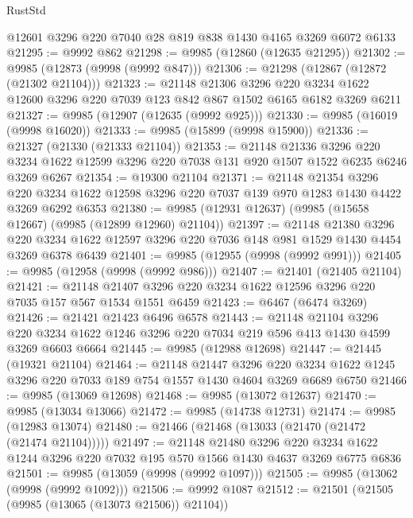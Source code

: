 \begin{lexlean}{RustStd}
\begin{coremodule}
    @12601
    @3296
    @220
    @7040
    @28
    @819
    @838
    @1430
    @4165
    @3269
    @6072
    @6133
@21295 := @9992 @862
@21298 := @9985 (@12860 (@12635 @21295))
@21302 := @9985 (@12873 (@9998 (@9992 @847)))
@21306 := @21298 (@12867 (@12872 (@21302 @21104)))
@21323 := @21148
    @21306
    @3296
    @220
    @3234
    @1622
    @12600
    @3296
    @220
    @7039
    @123
    @842
    @867
    @1502
    @6165
    @6182
    @3269
    @6211
@21327 := @9985 (@12907 (@12635 (@9992 @925)))
@21330 := @9985 (@16019 (@9998 @16020))
@21333 := @9985 (@15899 (@9998 @15900))
@21336 := @21327 (@21330 (@21333 @21104))
@21353 := @21148
    @21336
    @3296
    @220
    @3234
    @1622
    @12599
    @3296
    @220
    @7038
    @131
    @920
    @1507
    @1522
    @6235
    @6246
    @3269
    @6267
@21354 := @19300 @21104
@21371 := @21148
    @21354
    @3296
    @220
    @3234
    @1622
    @12598
    @3296
    @220
    @7037
    @139
    @970
    @1283
    @1430
    @4422
    @3269
    @6292
    @6353
@21380 := @9985 (@12931 @12637) (@9985 (@15658 @12667) (@9985 (@12899 @12960) @21104))
@21397 := @21148
    @21380
    @3296
    @220
    @3234
    @1622
    @12597
    @3296
    @220
    @7036
    @148
    @981
    @1529
    @1430
    @4454
    @3269
    @6378
    @6439
@21401 := @9985 (@12955 (@9998 (@9992 @991)))
@21405 := @9985 (@12958 (@9998 (@9992 @986)))
@21407 := @21401 (@21405 @21104)
@21421 := @21148 @21407 @3296 @220 @3234 @1622 @12596 @3296 @220 @7035 @157 @567 @1534 @1551 @6459
@21423 := @6467 (@6474 @3269)
@21426 := @21421 @21423 @6496 @6578
@21443 := @21148
    @21104
    @3296
    @220
    @3234
    @1622
    @1246
    @3296
    @220
    @7034
    @219
    @596
    @413
    @1430
    @4599
    @3269
    @6603
    @6664
@21445 := @9985 (@12988 @12698)
@21447 := @21445 (@19321 @21104)
@21464 := @21148
    @21447
    @3296
    @220
    @3234
    @1622
    @1245
    @3296
    @220
    @7033
    @189
    @754
    @1557
    @1430
    @4604
    @3269
    @6689
    @6750
@21466 := @9985 (@13069 @12698)
@21468 := @9985 (@13072 @12637)
@21470 := @9985 (@13034 @13066)
@21472 := @9985 (@14738 @12731)
@21474 := @9985 (@12983 @13074)
@21480 := @21466 (@21468 (@13033 (@21470 (@21472 (@21474 @21104)))))
@21497 := @21148
    @21480
    @3296
    @220
    @3234
    @1622
    @1244
    @3296
    @220
    @7032
    @195
    @570
    @1566
    @1430
    @4637
    @3269
    @6775
    @6836
@21501 := @9985 (@13059 (@9998 (@9992 @1097)))
@21505 := @9985 (@13062 (@9998 (@9992 @1092)))
@21506 := @9992 @1087
@21512 := @21501 (@21505 (@9985 (@13065 (@13073 @21506)) @21104))

\end{coremodule}
\end{lexlean}
